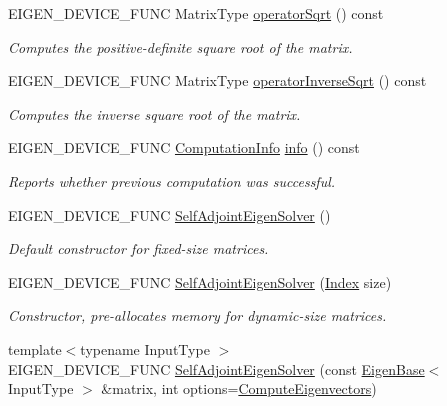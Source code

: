 \begin{DoxyCompactItemize}
E\+I\+G\+E\+N\+\_\+\+D\+E\+V\+I\+C\+E\+\_\+\+F\+U\+NC Matrix\+Type \hyperlink{group___eigenvalues___module_a5c5158fd86366081bdabec38112c2c8a}{operator\+Sqrt} () const
\begin{DoxyCompactList}\small\item\em Computes the positive-\/definite square root of the matrix. \end{DoxyCompactList}\item 
E\+I\+G\+E\+N\+\_\+\+D\+E\+V\+I\+C\+E\+\_\+\+F\+U\+NC Matrix\+Type \hyperlink{group___eigenvalues___module_a71fe0aea0b22d176efcea556c5c160f5}{operator\+Inverse\+Sqrt} () const
\begin{DoxyCompactList}\small\item\em Computes the inverse square root of the matrix. \end{DoxyCompactList}\item 
E\+I\+G\+E\+N\+\_\+\+D\+E\+V\+I\+C\+E\+\_\+\+F\+U\+NC \hyperlink{group__enums_ga85fad7b87587764e5cf6b513a9e0ee5e}{Computation\+Info} \hyperlink{group___eigenvalues___module_a56bd59b85a6f6f00ff7bff307ad0e015}{info} () const
\begin{DoxyCompactList}\small\item\em Reports whether previous computation was successful. \end{DoxyCompactList}\item 
E\+I\+G\+E\+N\+\_\+\+D\+E\+V\+I\+C\+E\+\_\+\+F\+U\+NC \hyperlink{group___eigenvalues___module_af3466b3809be4a7738d84493d80d4737}{Self\+Adjoint\+Eigen\+Solver} ()
\begin{DoxyCompactList}\small\item\em Default constructor for fixed-\/size matrices. \end{DoxyCompactList}\item 
E\+I\+G\+E\+N\+\_\+\+D\+E\+V\+I\+C\+E\+\_\+\+F\+U\+NC \hyperlink{group___eigenvalues___module_af20f466a4c29477271e91841e3382b27}{Self\+Adjoint\+Eigen\+Solver} (\hyperlink{group___eigenvalues___module_a8a59ab7734b6eae2754fd78bc7c3a360}{Index} size)
\begin{DoxyCompactList}\small\item\em Constructor, pre-\/allocates memory for dynamic-\/size matrices. \end{DoxyCompactList}\item 
{\footnotesize template$<$typename Input\+Type $>$ }\\E\+I\+G\+E\+N\+\_\+\+D\+E\+V\+I\+C\+E\+\_\+\+F\+U\+NC \hyperlink{group___eigenvalues___module_ade694ed7b0a4d9da9480cedc849be76f}{Self\+Adjoint\+Eigen\+Solver} (const \hyperlink{group___core___module_struct_eigen_1_1_eigen_base}{Eigen\+Base}$<$ Input\+Type $>$ \&matrix, int options=\hyperlink{group__enums_ggae3e239fb70022eb8747994cf5d68b4a9ada93d8885bde32b876ba4af01d3292cc}{Compute\+Eigenvectors})

\end{DoxyCompactItemize}
